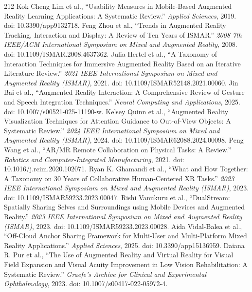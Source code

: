 \begin{thebibliography}{212}
 Kok Cheng Lim et al., ``Usability Measures in Mobile-Based Augmented Reality Learning Applications: A Systematic Review.'' \emph{Applied Sciences}, 2019. doi: 10.3390/app9132718.
 Feng Zhou et al., ``Trends in Augmented Reality Tracking, Interaction and Display: A Review of Ten Years of {ISMAR}.'' \emph{2008 7th IEEE/ACM International Symposium on Mixed and Augmented Reality}, 2008. doi: 10.1109/ISMAR.2008.4637362.
 Julia Hertel et al., ``A Taxonomy of Interaction Techniques for Immersive Augmented Reality Based on an Iterative Literature Review.'' \emph{2021 IEEE International Symposium on Mixed and Augmented Reality (ISMAR)}, 2021. doi: 10.1109/ISMAR52148.2021.00060.
 Jin Bai et al., ``Augmented Reality Interaction: A Comprehensive Review of Gesture and Speech Integration Techniques.'' \emph{Neural Computing and Applications}, 2025. doi: 10.1007/s00521-025-11190-w.
 Kelsey Quinn et al., ``Augmented Reality Visualization Techniques for Attention Guidance to Out-of-View Objects: A Systematic Review.'' \emph{2024 IEEE International Symposium on Mixed and Augmented Reality (ISMAR)}, 2024. doi: 10.1109/ISMAR62088.2024.00098.
 Peng Wang et al., ``{AR/MR} Remote Collaboration on Physical Tasks: A Review.'' \emph{Robotics and Computer-Integrated Manufacturing}, 2021. doi: 10.1016/j.rcim.2020.102071.
 Ryan K. Ghamandi et al., ``What and How Together: A Taxonomy on 30 Years of Collaborative Human-Centered {XR} Tasks.'' \emph{2023 IEEE International Symposium on Mixed and Augmented Reality (ISMAR)}, 2023. doi: 10.1109/ISMAR59233.2023.00047.
 Rishi Vanukuru et al., ``DualStream: Spatially Sharing Selves and Surroundings using Mobile Devices and Augmented Reality.'' \emph{2023 IEEE International Symposium on Mixed and Augmented Reality (ISMAR)}, 2023. doi: 10.1109/ISMAR59233.2023.00028.
 Aida Vidal-Balea et al., ``Off-Cloud Anchor Sharing Framework for Multi-User and Multi-Platform Mixed Reality Applications.'' \emph{Applied Sciences}, 2025. doi: 10.3390/app15136959.
 Daiana R. Pur et al., ``The Use of Augmented Reality and Virtual Reality for Visual Field Expansion and Visual Acuity Improvement in Low Vision Rehabilitation: A Systematic Review.'' \emph{Graefe's Archive for Clinical and Experimental Ophthalmology}, 2023. doi: 10.1007/s00417-022-05972-4.

\end{thebibliography}
